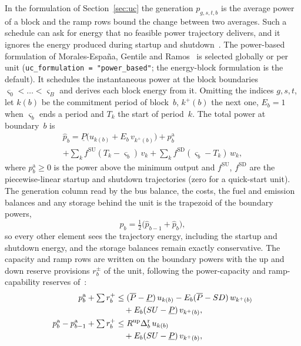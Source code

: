 In the formulation of Section~\ref{sec:uc} the generation $p_{g,s,t,b}$
is the average power of a block and the ramp rows bound the change
between two averages.  Such a schedule can ask for energy that no
feasible power trajectory delivers, and it ignores the energy produced
during startup and shutdown~\cite{moralesespana2017hidden}.  The
power-based formulation of Morales-Espa\~na, Gentile and
Ramos~\cite{moralesespana2015powerbased} is selected globally or per
unit (\texttt{uc\_formulation = "power\_based"}; the energy-block
formulation is the default).  It schedules the instantaneous power at
the block boundaries $\varsigma_0 < \dots < \varsigma_B$ and derives
each block energy from it.  Omitting the indices $g, s, t$, let $k(b)$
be the commitment period of block~$b$, $k^+(b)$ the next one,
$E_b = 1$ when $\varsigma_b$ ends a period and $T_k$ the start of
period~$k$.  The total power at boundary~$b$ is
\begin{multline}
\label{eq:pb_power}
\hat p_b = \underline{P}\bigl(u_{k(b)} + E_b\, v_{k^+(b)}\bigr)
  + p^\text{a}_b \\
  + \sum_k f^\text{SU}(T_k - \varsigma_b)\, v_k
  + \sum_k f^\text{SD}(\varsigma_b - T_k)\, w_k ,
\end{multline}
where $p^\text{a}_b \geq 0$ is the power above the minimum output and
$f^\text{SU}$, $f^\text{SD}$ are the piecewise-linear startup and
shutdown trajectories (zero for a quick-start unit).  The generation
column read by the bus balance, the costs, the fuel and emission
balances and any storage behind the unit is the trapezoid of the
boundary powers,
\begin{equation}
\label{eq:pb_trap}
p_b = \tfrac12 \bigl(\hat p_{b-1} + \hat p_b\bigr),
\end{equation}
so every other element sees the trajectory energy, including the
startup and shutdown energy, and the storage balances remain exactly
conservative.  The capacity and ramp rows are written on the boundary
powers with the up and down reserve provisions $r^{\pm}_b$ of the unit,
following the power-capacity and ramp-capability reserves
of~\cite{moralesespana2016reserves}:
\begin{align}
p^\text{a}_b + \textstyle\sum r^{+}_b &\leq
  (\overline{P} - \underline{P})\, u_{k(b)}
  - E_b (\overline{P} - SD)\, w_{k^+(b)} \notag \\
  &\quad + E_b (SU - \underline{P})\, v_{k^+(b)},
  \label{eq:pb_cap} \\
p^\text{a}_b - p^\text{a}_{b-1} + \textstyle\sum r^{+}_b &\leq
  R^\text{up} \Delta^\text{r}_b\, u_{k(b)} \notag \\
  &\quad + E_b (SU - \underline{P})\, v_{k^+(b)},
  \label{eq:pb_ramp}
\end{align}
